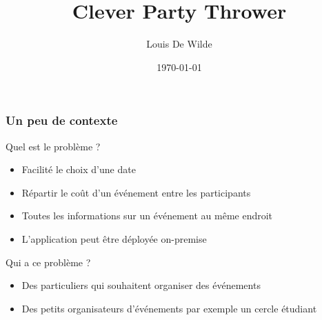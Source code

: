 \documentclass[aspectratio=169]{beamer}
\title{Clever Party Thrower}
\author{Louis De Wilde}
\date{\today}
\begin{document}
    \frame{\titlepage}
    \begin{frame}
        \frametitle{Un peu de contexte}
        Quel est le problème ?
        \begin{itemize}
            \item Facilité le choix d'une date
            \item Répartir le coût d'un événement entre les participants
            \item Toutes les informations sur un événement au même endroit
            \item L'application peut être déployée on-premise
        \end{itemize}
        Qui a ce problème ?
        \begin{itemize}
            \item Des particuliers qui souhaitent organiser des événements
            \item Des petits organisateurs d'événements par exemple un cercle étudiant
        \end{itemize}
    \end{frame}
\end{document}
